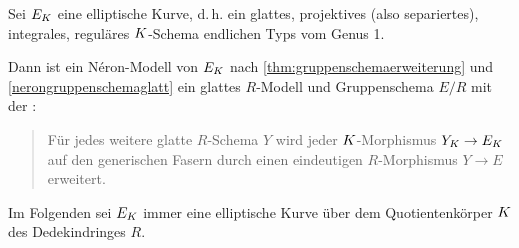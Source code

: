\documentclass[german]{scrreprt}
\begin{document}
\begin{Bemerkung}
  Sei $E_{K}$ eine elliptische Kurve, d.\,h. ein
  glattes, projektives (also separiertes), integrales, reguläres
  $K$-Schema endlichen Typs vom Genus 1.
  
  Dann ist ein Néron-Modell von $E_{K}$ nach
  \ref{thm:gruppenschemaerweiterung} und \ref{nerongruppenschemaglatt} ein
  glattes $R$-Modell und Gruppenschema $E/R$ mit der
  \NAbbEig:
  \begin{quote}
    Für jedes weitere glatte $R$-Schema $Y$ wird jeder
    $K$-Morphismus $Y_{K}\to E_{K}$ auf den generischen Fasern durch
    einen eindeutigen $R$-Morphismus $Y\to E$ erweitert.
  \end{quote}
  \cite[Chapter IV.5]{silverman2}
\end{Bemerkung}

Im Folgenden sei $E_{K}$ immer eine elliptische Kurve über dem
Quotientenkörper $K$ des Dedekindringes $R$.
\end{document}
